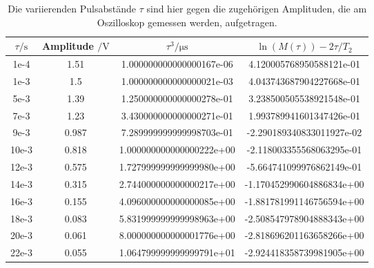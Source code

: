 \begin{table} \caption{Die variierenden Pulsabstände $\tau$ sind hier gegen die zugehörigen Amplituden, die am Oszilloskop gemessen werden, aufgetragen.}
    \label{tab:t2}
    \centering
    \begin{tabular}{S[] S[] | S[] S[]}
        \toprule
        {$\tau / \si{\second}$} & {Amplitude $/ \si{\volt}$} & {$\tau^3 / \si{\micro\second}$} & {$\ln\left(M(\tau)\right) - 2\tau/T_2$} \\
        \midrule
        1e-4  &  1.51   &  1.000000000000000167e-06 & 4.120005768950588121e-01 \\
        1e-3  &  1.5    &  1.000000000000000021e-03 & 4.043743687904227668e-01 \\
        5e-3  &  1.39   &  1.250000000000000278e-01 & 3.238500505538921548e-01 \\
        7e-3  &  1.23   &  3.430000000000000271e-01 & 1.993789941601347426e-01 \\
        9e-3  &  0.987  &  7.289999999999998703e-01 & -2.290189340833011927e-02 \\
        10e-3 &  0.818  &  1.000000000000000222e+00 & -2.118003355568063295e-01 \\
        12e-3 &  0.575  &  1.727999999999999980e+00 & -5.664741099976862149e-01 \\
        14e-3 &  0.315  &  2.744000000000000217e+00 & -1.170452990604886834e+00 \\
        16e-3 &  0.155  &  4.096000000000000085e+00 & -1.881781991146756594e+00 \\
        18e-3 &  0.083  &  5.831999999999998963e+00 & -2.508547978904888343e+00 \\
        20e-3 &  0.061  &  8.000000000000001776e+00 & -2.818696201163658266e+00 \\
        22e-3 &  0.055  &  1.064799999999999791e+01 & -2.924418358739981905e+00 \\
        \bottomrule
    \end{tabular}
\end{table}